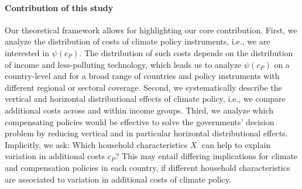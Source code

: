 \documentclass[12pt, a4paper]{article}
\begin{document}
\paragraph{Contribution of this study}
Our theoretical framework allows for highlighting our core contribution. First, we analyze the distribution of costs of climate policy instruments, i.e., we are interested in $\psi(c_{P})$. The distribution of such costs depends on the distribution of income and less-polluting technology, which leads us to analyze $\psi(c_{P})$ on a country-level and for a broad range of countries and policy instruments with different regional or sectoral coverage. Second, we systematically describe the vertical and horizontal distributional effects of climate policy, i.e., we compare additional costs across and within income groups. Third, we analyze which compensating policies would be effective to solve the governments' decision problem by reducing vertical and in particular horizontal distributional effects. Implicitly, we ask: Which household characteristics $X^{\prime}$ can help to explain variation in additional costs $c_{P}$? This may entail differing implications for climate and compensation policies in each country, if different household characteristics are associated to variation in additional costs of climate policy.    


\end{document}
